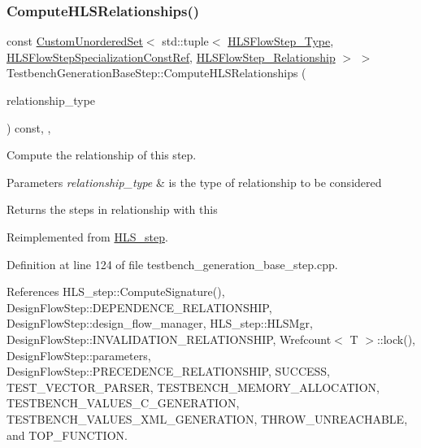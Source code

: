 \subsubsection{\texorpdfstring{Compute\+H\+L\+S\+Relationships()}{ComputeHLSRelationships()}}
{\footnotesize\ttfamily const \hyperlink{classCustomUnorderedSet}{Custom\+Unordered\+Set}$<$ std\+::tuple$<$ \hyperlink{hls__step_8hpp_ada16bc22905016180e26fc7e39537f8d}{H\+L\+S\+Flow\+Step\+\_\+\+Type}, \hyperlink{hls__step_8hpp_a5fdd2edf290c196531d21d68e13f0e74}{H\+L\+S\+Flow\+Step\+Specialization\+Const\+Ref}, \hyperlink{hls__step_8hpp_a3ad360b9b11e6bf0683d5562a0ceb169}{H\+L\+S\+Flow\+Step\+\_\+\+Relationship} $>$ $>$ Testbench\+Generation\+Base\+Step\+::\+Compute\+H\+L\+S\+Relationships (\begin{DoxyParamCaption}\item[{const \hyperlink{classDesignFlowStep_a723a3baf19ff2ceb77bc13e099d0b1b7}{Design\+Flow\+Step\+::\+Relationship\+Type}}]{relationship\+\_\+type }\end{DoxyParamCaption}) const\hspace{0.3cm}{\ttfamily [override]}, {\ttfamily [protected]}, {\ttfamily [virtual]}}



Compute the relationship of this step. 


\begin{DoxyParams}{Parameters}
{\em relationship\+\_\+type} & is the type of relationship to be considered \\
\hline
\end{DoxyParams}
\begin{DoxyReturn}{Returns}
the steps in relationship with this 
\end{DoxyReturn}


Reimplemented from \hyperlink{classHLS__step_aed0ce8cca9a1ef18e705fc1032ad4de5}{H\+L\+S\+\_\+step}.



Definition at line 124 of file testbench\+\_\+generation\+\_\+base\+\_\+step.\+cpp.



References H\+L\+S\+\_\+step\+::\+Compute\+Signature(), Design\+Flow\+Step\+::\+D\+E\+P\+E\+N\+D\+E\+N\+C\+E\+\_\+\+R\+E\+L\+A\+T\+I\+O\+N\+S\+H\+IP, Design\+Flow\+Step\+::design\+\_\+flow\+\_\+manager, H\+L\+S\+\_\+step\+::\+H\+L\+S\+Mgr, Design\+Flow\+Step\+::\+I\+N\+V\+A\+L\+I\+D\+A\+T\+I\+O\+N\+\_\+\+R\+E\+L\+A\+T\+I\+O\+N\+S\+H\+IP, Wrefcount$<$ T $>$\+::lock(), Design\+Flow\+Step\+::parameters, Design\+Flow\+Step\+::\+P\+R\+E\+C\+E\+D\+E\+N\+C\+E\+\_\+\+R\+E\+L\+A\+T\+I\+O\+N\+S\+H\+IP, S\+U\+C\+C\+E\+SS, T\+E\+S\+T\+\_\+\+V\+E\+C\+T\+O\+R\+\_\+\+P\+A\+R\+S\+ER, T\+E\+S\+T\+B\+E\+N\+C\+H\+\_\+\+M\+E\+M\+O\+R\+Y\+\_\+\+A\+L\+L\+O\+C\+A\+T\+I\+ON, T\+E\+S\+T\+B\+E\+N\+C\+H\+\_\+\+V\+A\+L\+U\+E\+S\+\_\+\+C\+\_\+\+G\+E\+N\+E\+R\+A\+T\+I\+ON, T\+E\+S\+T\+B\+E\+N\+C\+H\+\_\+\+V\+A\+L\+U\+E\+S\+\_\+\+X\+M\+L\+\_\+\+G\+E\+N\+E\+R\+A\+T\+I\+ON, T\+H\+R\+O\+W\+\_\+\+U\+N\+R\+E\+A\+C\+H\+A\+B\+LE, and T\+O\+P\+\_\+\+F\+U\+N\+C\+T\+I\+ON.


